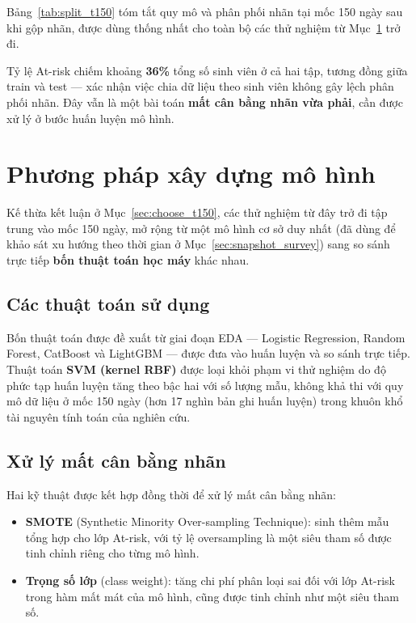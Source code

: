 \documentclass[a4paper]{article}
\newcommand{\code}[1]{{\ttfamily\def\_{\textunderscore\discretionary{}{}{}}#1}}
\def\code#1{#1}%
\def\_{ }%
\begin{document}
Bảng~\ref{tab:split_t150} tóm tắt quy mô và phân phối nhãn tại mốc 150 ngày
sau khi gộp nhãn, được dùng thống nhất cho toàn bộ các thử nghiệm từ
Mục~\ref{sec:methodology} trở đi.



Tỷ lệ At-risk chiếm khoảng \textbf{36\%} tổng số sinh viên ở cả hai tập, tương
đồng giữa train và test --- xác nhận việc chia dữ liệu theo sinh viên không
gây lệch phân phối nhãn. Đây vẫn là một bài toán \textbf{mất cân bằng nhãn vừa
phải}, cần được xử lý ở bước huấn luyện mô hình.

\section{Phương pháp xây dựng mô hình}
\label{sec:methodology}

Kế thừa kết luận ở Mục~\ref{sec:choose_t150}, các thử nghiệm từ đây trở đi tập
trung vào mốc 150 ngày, mở rộng từ một mô hình cơ sở duy nhất (đã dùng để khảo
sát xu hướng theo thời gian ở Mục~\ref{sec:snapshot_survey}) sang so sánh trực
tiếp \textbf{bốn thuật toán học máy} khác nhau.

\subsection{Các thuật toán sử dụng}

Bốn thuật toán được đề xuất từ giai đoạn EDA --- Logistic Regression, Random
Forest, CatBoost và LightGBM --- được đưa vào huấn luyện và so sánh trực tiếp.
Thuật toán \textbf{SVM (kernel RBF)} được loại khỏi phạm vi thử nghiệm do độ
phức tạp huấn luyện tăng theo bậc hai với số lượng mẫu, không khả thi với quy
mô dữ liệu ở mốc 150 ngày (hơn 17 nghìn bản ghi huấn luyện) trong khuôn khổ tài
nguyên tính toán của nghiên cứu.

\subsection{Xử lý mất cân bằng nhãn}

Hai kỹ thuật được kết hợp đồng thời để xử lý mất cân bằng nhãn:

\begin{itemize}[leftmargin=*]
  \item \textbf{SMOTE} (Synthetic Minority Over-sampling Technique): sinh thêm
        mẫu tổng hợp cho lớp At-risk, với tỷ lệ oversampling là một siêu tham
        số được tinh chỉnh riêng cho từng mô hình.
  \item \textbf{Trọng số lớp} (\code{class\_weight}): tăng chi phí phân loại
        sai đối với lớp At-risk trong hàm mất mát của mô hình, cũng được tinh
        chỉnh như một siêu tham số.
\end{itemize}
\end{document}
